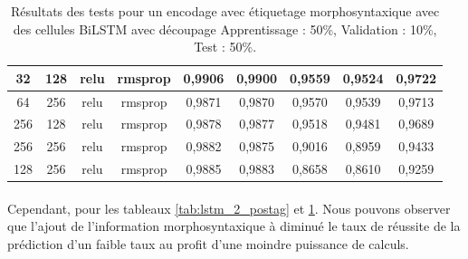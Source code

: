 \begin{table}[H]
{\begin{tabular}{|c|c|c|c|c|c|c|c|c|}
				32 & 128 & relu & rmsprop & 0,9906 & 0,9900 & 0,9559 & 0,9524 & 0,9722 \\ \hline
				64 & 256 & relu & rmsprop & 0,9871 & 0,9870 & 0,9570 & 0,9539 & 0,9713 \\ \hline
				256 & 128 & relu & rmsprop & 0,9878 & 0,9877 & 0,9518 & 0,9481 & 0,9689 \\ \hline
				256 & 256 & relu & rmsprop & 0,9882 & 0,9875 & 0,9016 & 0,8959 & 0,9433 \\ \hline
				128 & 256 & relu & rmsprop & 0,9885 & 0,9883 & 0,8658 & 0,8610 & 0,9259 \\ \hline
			\end{tabular}%
		}
		\caption{Résultats des tests pour un encodage avec étiquetage morphosyntaxique avec des cellules BiLSTM avec découpage Apprentissage : 50\%, Validation : 10\%, Test : 50\%.}
		\label{tab:bilstm_2_postag}
	\end{table}
	\paragraph{}
	Cependant, pour les tableaux \ref{tab:lstm_2_postag} et \ref{tab:bilstm_2_postag}. Nous pouvons observer que l'ajout de l'information morphosyntaxique à diminué le taux de réussite de la prédiction d'un faible taux au profit d'une moindre puissance de calculs.
	

